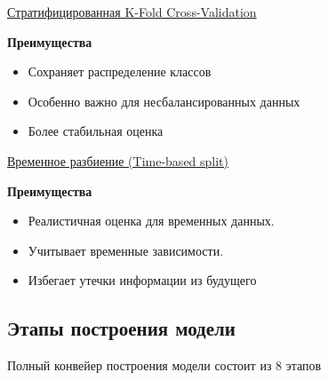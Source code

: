 \underline{Стратифицированная K-Fold Cross-Validation}


\textbf{Преимущества}
\begin{itemize}
    \item Сохраняет распределение классов
    \item Особенно важно для несбалансированных данных
    \item Более стабильная оценка
\end{itemize}

\underline{Временное разбиение (Time-based split)}


\textbf{Преимущества}
\begin{itemize}
    \item Реалистичная оценка для временных данных.
    \item Учитывает временные зависимости.
    \item Избегает утечки информации из будущего
\end{itemize}

\subsection{Этапы построения модели}

Полный конвейер построения модели состоит из 8 этапов


